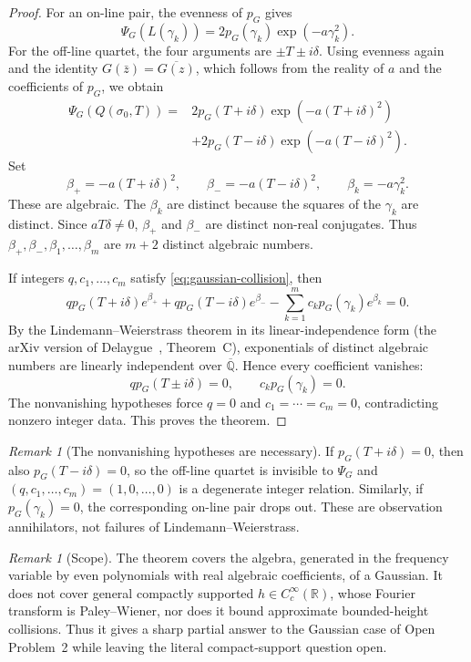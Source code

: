 \documentclass[12pt]{amsart}
\theoremstyle{definition}
\theoremstyle{remark}
\newtheorem{remark}[definition]{Remark}
\theoremstyle{plain}
\newcommand{\RR}{\mathbb{R}}
\newcommand{\QQ}{\mathbb{Q}}
\begin{document}
\begin{proof}
For an on-line pair, the evenness of $p_G$ gives
\[
  \Psi_G(L(\gamma_k))
  =2p_G(\gamma_k)\exp(-a\gamma_k^2).
\]
For the off-line quartet, the four arguments are
$\pm T\pm i\delta$.  Using evenness again and the identity
$G(\bar z)=\overline{G(z)}$, which follows from the reality of $a$ and the
coefficients of $p_G$, we obtain
\[
  \begin{aligned}
  \Psi_G(Q(\sigma_0,T))
  ={}&2p_G(T+i\delta)\exp(-a(T+i\delta)^2)\\
   &+2p_G(T-i\delta)\exp(-a(T-i\delta)^2).
  \end{aligned}
\]
Set
\[
  \beta_+=-a(T+i\delta)^2,\qquad
  \beta_-=-a(T-i\delta)^2,\qquad
  \beta_k=-a\gamma_k^2.
\]
These are algebraic.  The $\beta_k$ are distinct because the squares of the
$\gamma_k$ are distinct.  Since $aT\delta\neq 0$, $\beta_+$ and $\beta_-$ are
distinct non-real conjugates.  Thus
$\beta_+,\beta_-,\beta_1,\ldots,\beta_m$ are $m+2$ distinct algebraic
numbers.

If integers $q,c_1,\ldots,c_m$ satisfy \eqref{eq:gaussian-collision}, then
\[
  qp_G(T+i\delta)e^{\beta_+}
  +qp_G(T-i\delta)e^{\beta_-}
  -\sum_{k=1}^mc_kp_G(\gamma_k)e^{\beta_k}=0.
\]
By the Lindemann--Weierstrass theorem in its linear-independence form
(the arXiv version of Delaygue~\cite{Delaygue2025}, Theorem~C), exponentials
of distinct algebraic
numbers are linearly independent over $\overline{\QQ}$.  Hence every
coefficient vanishes:
\[
  qp_G(T\pm i\delta)=0,\qquad c_kp_G(\gamma_k)=0.
\]
The nonvanishing hypotheses force $q=0$ and $c_1=\cdots=c_m=0$, contradicting
nonzero integer data.  This proves the theorem.
\end{proof}

\begin{remark}[The nonvanishing hypotheses are necessary]
\label{rem:gaussian-nonzero}%
If $p_G(T+i\delta)=0$, then also $p_G(T-i\delta)=0$, so the off-line quartet is
invisible to $\Psi_G$ and $(q,c_1,\ldots,c_m)=(1,0,\ldots,0)$ is a degenerate
integer relation.  Similarly, if $p_G(\gamma_k)=0$, the corresponding on-line
pair drops out.  These are observation annihilators, not failures of
Lindemann--Weierstrass.
\end{remark}

\begin{remark}[Scope]
\label{rem:gaussian-scope}%
The theorem covers the algebra, generated in the frequency variable by even
polynomials with real algebraic coefficients, of a Gaussian.  It does not cover
general compactly supported $h\in C_c^\infty(\RR)$, whose Fourier transform is
Paley--Wiener, nor does it bound approximate bounded-height collisions.  Thus
it gives a sharp partial answer to the Gaussian case of Open Problem~2 while
leaving the literal compact-support question open.
\end{remark}
\end{document}
